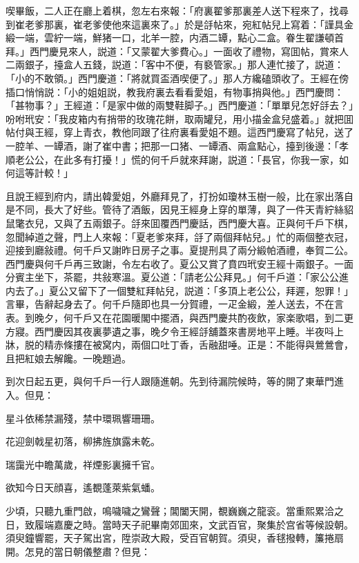 喫畢飯，二人正在廳上着棋，忽左右來報：「府裏翟爹那裏差人送下程來了，找尋到崔老爹那裏，崔老爹使他來這裏來了。」於是㧱帖來，宛紅帖兒上寫着：「謹具金緞一端，雲紵一端，鮮猪一口，北羊一腔，内酒二罈，點心二盒。眷生翟謙頓首拜。」西門慶見來人，説道：「又蒙翟大爹費心。」一面收了禮物，寫囬帖，賞來人二兩銀子，擡盒人五錢，説道：「客中不便，有褻管家。」那人連忙接了，説道：「小的不敢領。」西門慶道：「將就買盃酒喫便了。」那人方纔磕頭收了。王經在傍插口悄悄説：「小的姐姐説，教我府裏去看看愛姐，有物事捎與他。」西門慶問：「甚物事？」王經道：「是家中做的兩雙鞋脚子。」西門慶道：「單單兒怎好㧱去？」吩咐玳安：「我皮箱内有捎带的玫瑰花餅，取兩罐兒，用小描金盒兒盛着。」就把囬帖付與王經，穿上青衣，教他同跟了往府裏看愛姐不題。這西門慶寫了帖兒，送了一腔羊、一罈酒，謝了崔中書；把那一口猪、一罈酒、兩盒點心，擡到後邊：「孝順老公公，在此多有打擾！」慌的何千戶就來拜謝，説道：「長官，你我一家，如何這等計較！」

且說王經到府内，請出韓愛姐，外廳拜見了，打扮如瓊林玉樹一般，比在家出落自是不同，長大了好些。管待了酒飯，因見王經身上穿的單薄，與了一件天青紵絲貂鼠氅衣兒，又與了五兩銀子。㧱來囬覆西門慶話，西門慶大喜。正與何千戶下棋，忽聞綽道之聲，門上人來報：「夏老爹來拜，㧱了兩個拜帖兒。」忙的兩個整衣冠，迎接到廳敍禮。何千戶又謝昨日房子之事。夏提刑具了兩分緞帕酒禮，奉賀二公。西門慶與何千戶再三致謝，令左右收了。夏公又賞了賁四玳安王經十兩銀子。一面分賓主坐下，茶罷，共敍寒溫。夏公道：「請老公公拜見。」何千戶道：「家公公進内去了。」夏公又留下了一個雙紅拜帖兒，説道：「多頂上老公公，拜遲，恕罪！」言畢，告辭起身去了。何千戶隨即也具一分賀禮，一疋金緞，差人送去，不在言表。到晚夕，何千戶又在花園暖閣中擺酒，與西門慶共酌夜飲，家楽歌唱，到二更方寢。西門慶因其夜裏夢遺之事，晚夕令王經㧱舖蓋來書房地平上睡。半夜呌上牀，脱的精赤條摟在被窝内，兩個口吐丁香，舌融甜唾。正是：不能得與鶯鶯會，且把紅娘去解饞。一晚題過。

到次日起五更，與何千戶一行人跟隨進朝。先到待漏院候時，等的開了東華門進入。但見：

\begin{myquote}
星斗依稀禁漏殘，禁中環珮響珊珊。

花迎劍戟星初落，柳拂旌旗露未乾。

瑞靄光中瞻萬歲，祥煙影裏擁千官。

欲知今日天顔喜，遙覩蓬萊紫氣蟠。
\end{myquote}

少頃，只聽九重門啟，鳴噦噦之鸞聲；閶闔天開，覩巍巍之龍衮。當重熙累洽之日，致履端嘉慶之時。當時天子祀畢南郊囬來，文武百官，聚集於宫省等候設朝。須臾鐘響罷，天子駕出宮，陞崇政大殿，受百官朝賀。須臾，香毬撥轉，簾捲扇開。怎見的當日朝儀整肅？但見：

